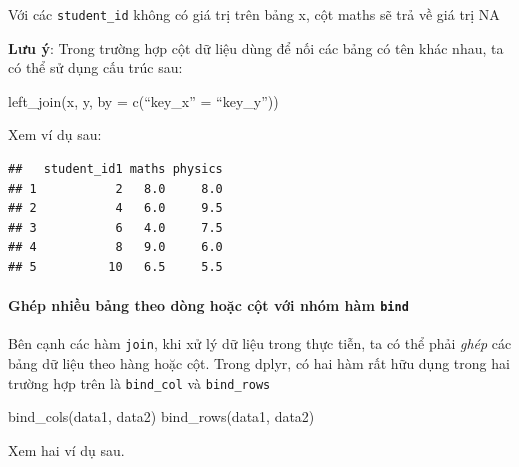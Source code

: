 \documentclass[]{krantz}
\makeatletter
\newenvironment{Shaded}{\begin{snugshade}}{\end{snugshade}}
\newcommand{\DataTypeTok}[1]{\textcolor[rgb]{0.27,0.27,0.27}{#1}}
\newcommand{\DecValTok}[1]{\textcolor[rgb]{0.06,0.06,0.06}{#1}}
\newcommand{\KeywordTok}[1]{\textcolor[rgb]{0.27,0.27,0.27}{\textbf{#1}}}
\newcommand{\NormalTok}[1]{#1}
\newcommand{\OperatorTok}[1]{\textcolor[rgb]{0.43,0.43,0.43}{\textbf{#1}}}
\newcommand{\StringTok}[1]{\textcolor[rgb]{0.5,0.5,0.5}{#1}}
\let\oldparagraph\paragraph
\renewcommand{\paragraph}[1]{\oldparagraph{#1}\mbox{}}
\renewenvironment{quote}{\begin{VF}}{\end{VF}}
\newenvironment{kframe}{%
\medskip{}
\setlength{\fboxsep}{.8em}
 \def\at@end@of@kframe{}%
 \ifinner\ifhmode%
  \def\at@end@of@kframe{\end{minipage}}%
  \begin{minipage}{\columnwidth}%
 \fi\fi%
 \def\FrameCommand##1{\hskip\@totalleftmargin \hskip-\fboxsep
 \colorbox{shadecolor}{##1}\hskip-\fboxsep
     \hskip-\linewidth \hskip-\@totalleftmargin \hskip\columnwidth}%
 \MakeFramed {\advance\hsize-\width
   \@totalleftmargin\z@ \linewidth\hsize
   \@setminipage}}%
 {\par\unskip\endMakeFramed%
 \at@end@of@kframe}
\renewenvironment{Shaded}{\begin{kframe}}{\end{kframe}}
\renewenvironment{Shaded}{\begin{snugshade}}{\end{snugshade}}
\renewcommand{\DataTypeTok}[1]{\textcolor[rgb]{0.13,0.29,0.53}{#1}}
\renewcommand{\DecValTok}[1]{\textcolor[rgb]{0.00,0.00,0.81}{#1}}
\renewcommand{\KeywordTok}[1]{\textcolor[rgb]{0.13,0.29,0.53}{\textbf{#1}}}
\renewcommand{\NormalTok}[1]{#1}
\renewcommand{\OperatorTok}[1]{\textcolor[rgb]{0.81,0.36,0.00}{\textbf{#1}}}
\renewcommand{\StringTok}[1]{\textcolor[rgb]{0.31,0.60,0.02}{#1}}
\theoremstyle{definition}
\theoremstyle{definition}
\theoremstyle{definition}
\theoremstyle{remark}
\makeatother
\begin{document}
Với các \texttt{student\_id} không có giá trị trên bảng x, cột maths sẽ
trả về giá trị NA

\textbf{Lưu ý}: Trong trường hợp cột dữ liệu dùng để nối các bảng có tên
khác nhau, ta có thể sử dụng cấu trúc sau:

\begin{quote}
left\_join(x, y, by = c(``key\_x'' = ``key\_y''))
\end{quote}

Xem ví dụ sau:

\begin{Shaded}
\end{Shaded}

\begin{verbatim}
##   student_id1 maths physics
## 1           2   8.0     8.0
## 2           4   6.0     9.5
## 3           6   4.0     7.5
## 4           8   9.0     6.0
## 5          10   6.5     5.5
\end{verbatim}

\hypertarget{ghep-nhiu-bang-theo-dong-hoc-ct-vi-nhom-ham-bind}{%
\paragraph{\texorpdfstring{Ghép nhiều bảng theo dòng hoặc cột với nhóm
hàm
\texttt{bind}}{Ghép nhiều bảng theo dòng hoặc cột với nhóm hàm bind}}\label{ghep-nhiu-bang-theo-dong-hoc-ct-vi-nhom-ham-bind}}

Bên cạnh các hàm \texttt{join}, khi xử lý dữ liệu trong thực tiễn, ta có
thể phải \emph{ghép} các bảng dữ liệu theo hàng hoặc cột. Trong dplyr,
có hai hàm rất hữu dụng trong hai trường hợp trên là \texttt{bind\_col}
và \texttt{bind\_rows}

\begin{quote}
bind\_cols(data1, data2) bind\_rows(data1, data2)
\end{quote}

Xem hai ví dụ sau.
\end{document}
